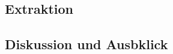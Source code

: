 \subsection{Extraktion}
\label{afb:extraction}







\subsection{Diskussion und Ausbklick}
\label{afb:diskussion}

 


